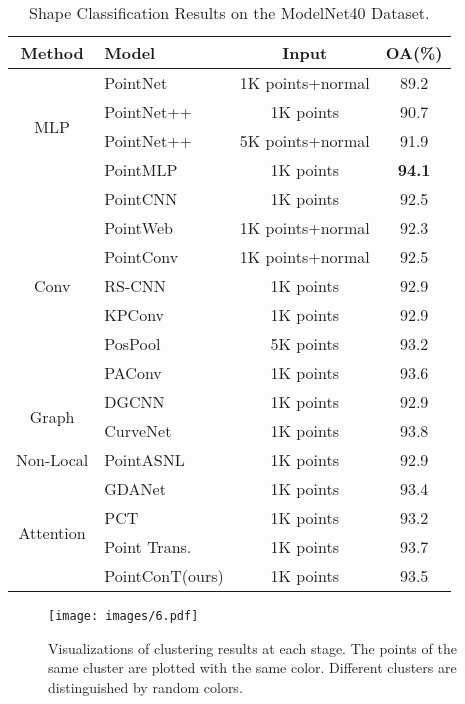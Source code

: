\documentclass[lettersize,journal]{IEEEtran}
\begin{document}
\begin{table}[h]
  \caption{Shape Classification Results on the ModelNet40 Dataset.\protect\\
  }
    \label{Table:cls}
    \begin{center}
\begin{tabular}{c|l|c|c}
    \toprule
    Method & Model & Input & OA(\%) \\
    \midrule
    \multirow{4}{*}{MLP} & PointNet\cite{pointnet} & 1K points+normal & 89.2\\
    ~ & PointNet++\cite{pointnet2} & 1K points & 90.7\\
    ~ & PointNet++\cite{pointnet2} & 5K points+normal & 91.9\\
    ~ & PointMLP\cite{pointmlp} & 1K points & \bfseries{94.1}\\ 
    \midrule
    \multirow{7}{*}{Conv} & PointCNN\cite{pointcnn} & 1K points & 92.5\\
    ~ & PointWeb\cite{pointweb} & 1K points+normal & 92.3\\
    ~ & PointConv\cite{pointconv} & 1K points+normal & 92.5\\
    ~ & RS-CNN\cite{rscnn}  & 1K points & 92.9\\
    ~ & KPConv\cite{kpconv} & 1K points & 92.9\\
    ~ & PosPool\cite{pospool} & 5K points & 93.2\\
    ~ & PAConv\cite{paconv}  & 1K points & 93.6\\
    \midrule
    \multirow{2}{*}{Graph} & DGCNN\cite{dgcnn} & 1K points & 92.9\\
    ~ & CurveNet\cite{curvenet} & 1K points & 93.8\\
    \midrule
    Non-Local & PointASNL\cite{pointasnl} & 1K points & 92.9\\
    \midrule
    \multirow{5}{*}{Attention} & GDANet\cite{gdanet}  & 1K points & 93.4\\
    ~ & PCT\cite{pct} & 1K points & 93.2\\
    ~ & Point Trans.\cite{pointtransformer} & 1K points & 93.7\\ 
    ~ & PointConT(ours) & 1K points & 93.5\\
    \bottomrule
    \end{tabular}\end{center}
\end{table}


\begin{figure*}
  \centering
\texttt{[image: images/6.pdf]}
  \caption{Visualizations of clustering results at each stage. The points of the same cluster are plotted with the same color. Different clusters are distinguished by random colors.}
  \label{fig:cluster}
\end{figure*}
\end{document}
